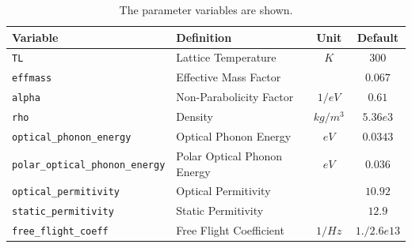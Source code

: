 \begin{table}[ht!]
\centering
\begin{tabular}{|l|p{4.5cm}|c|c|}
\hline
\textbf{Variable}   & \textbf{Definition}   & \textbf{Unit} & \textbf{Default} \\
\hline
\texttt{TL}  & Lattice Temperature & $K$ & $300$ \\
\hline
\texttt{effmass}  & Effective Mass Factor &  & $0.067$ \\
\hline
\texttt{alpha}  & Non-Parabolicity Factor & $1/eV$ & $0.61$ \\
\hline
\texttt{rho}  & Density & $kg/m^3$ &$5.36e3$ \\
\hline
\texttt{optical\_phonon\_energy}  &  Optical Phonon Energy  & $eV$ &$0.0343$ \\
\hline
\texttt{polar\_optical\_phonon\_energy}  &  Polar Optical Phonon Energy  & $eV$ &$0.036$\\
\hline
\texttt{optical\_permitivity}  &  Optical Permitivity  & & $10.92$ \\
\hline
\texttt{static\_permitivity}  & Static Permitivity   & & $12.9$ \\
\hline
\texttt{free\_flight\_coeff}  &  Free Flight Coefficient  & $1/Hz$ & $1. / 2.6e13$ \\
\hline
\end{tabular}
\caption{The parameter variables are shown.}
\label{tab:paras}
\end{table}




